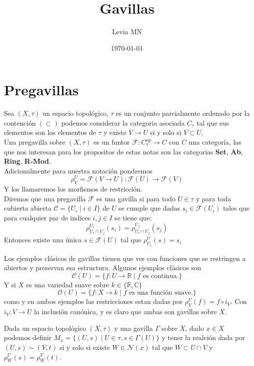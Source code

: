 \documentclass[14pt]{extarticle}
\title{Gavillas}
\author{Levia MN}
\date{\today}
\newcommand{\catname}[1]{{\normalfont\textbf{#1}}}
\newcommand{\Set}{\catname{Set}}
\newcommand{\Ring}{\catname{Ring}}
\newcommand{\RModules}{\catname{R-Mod}}
\newcommand{\Ab}{\catname{Ab}}
\begin{document}
\maketitle
\section{Pregavillas}
\begin{definicion}{}{}
    Sea $(X, \tau)$ un espacio topológico,
    $\tau$ es un conjunto parcialmente ordenado
    por la contención $(\subset)$ podemos 
    considerar la categoria asociada $C_\tau$
    tal que sus elementos son los elementos de 
    $\tau$ y existe $V\rightarrow U$ si y solo si 
    $V \subset U$.\\
    Una pregavilla sobre $(X,\tau)$ es un funtor
    $\mathcal{F}:C_{\tau}^{op}\rightarrow C$
    con $C$ una categoría, las que nos interesan
    para los propositos de estas notas son las 
    categorias \Set, \Ab, \Ring, \RModules.\\
    Adicionalmente para nuestra notación pondremos
    $$\rho_{V}^{U}
    =\mathcal{F}(V\rightarrow U):\mathcal{F}(U) \rightarrow \mathcal{F}(V)$$
    Y los llamaremos los morfismos de restricción.\\
    Diremos que una pregavilla $\mathcal{F}$ es 
    una gavilla si para todo $U\in \tau$ y para toda
    cubierta abierta $\mathcal{C}=\{U_i\mid i\in I\}$ de $U$
    se cumple que dadas $s_i \in \mathcal{F}(U_i)$ 
    tales que para cualquier par de indices $i, j\in I$
    se tiene que:
    $$\rho_{U_i \cap U_j}^{U_i}(s_i)=\rho_{U_i \cap U_j}^{U_j}(s_j)$$
    Entonces existe una única $s\in \mathcal{F}(U)$
    tal que $\rho_{U_i}^{U}(s) = s_i$
\end{definicion}

\begin{ejemplo}{}{}
    Los ejemplos clásicos de gavillas tienen
    que ver con funciones que se restringen 
    a abiertos y preservan esa estructura.
    Algunos ejemplos clásicos son 
    $$\mathcal{C}(U)=\{f:U\rightarrow \mathbb{R} \mid f \mbox{ es continua.}\}$$
    Y si $X$ es una variedad suave sobre $k\in \{\mathbb{R}, \mathbb{C}\}$
    $$\mathcal{O}(U)=\{f:X\rightarrow k\mid f\mbox{ es una función suave.}\}$$
    como y en ambos ejemplos las restricciones estan dadas por
    $\rho_{V}^{U}(f)=f\circ i_{V}$.
    Con $i_{V}:V\rightarrow U$ la inclusión canónica,
    y es claro que ambas son gavillas sobre $X$.
\end{ejemplo}

\begin{definicion}{}{}
    Dada un espacio topológico $(X,\tau)$
    y una gavilla $\Gamma$ sobre $X$,
    dado $x\in X$ podemos 
    definir $M_x=\{(U,s) \mid U\in \tau, s\in \Gamma(U)\}$
    y tener la realción dada por $(U,s)\sim (V,t)$ si y solo si
    existe $W \in \mathcal{N}(x)$ tal que $W \subset U\cap V$
    y $\rho_{W}^{U}(s)= \rho_{W}^{V}(t)$.
\end{definicion}
\end{document}
